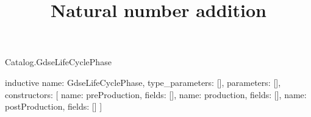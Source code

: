 \begin{lexlean}{Catalog.GdseLifeCyclePhase}
\title{Natural number addition}
\begin{semanticmodule}
inductive{
  name: GdseLifeCyclePhase,
  type_parameters: [],
  parameters: [],
  constructors: [
    {name: preProduction, fields: []},
    {name: production, fields: []},
    {name: postProduction, fields: []}
  ]
}
\end{semanticmodule}
\end{lexlean}
